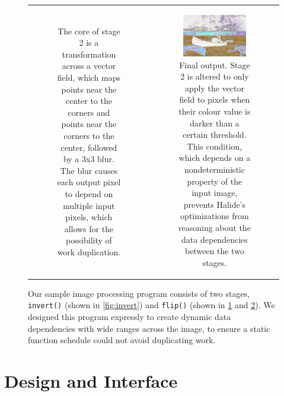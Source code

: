 \documentclass{article}
\begin{document}
\begin{figure}[t]
\begin{tabular}{cc}
\begin{subfigure}[b]{0.45\textwidth}
\begin{center}
		\end{center}
		\caption{The core of stage 2 is a transformation across a vector field, which maps points near the center to the corners and points near the corners to the center, followed by a 3x3 blur. The blur causes each output pixel to depend on multiple input pixels, which allows for the possibility of work duplication.}
		\label{fig:flip-blur-1}
	\end{subfigure} &
	\begin{subfigure}[b]{0.45\textwidth}
		\begin{center}
		\includegraphics[width=0.85\textwidth]{canoe-3.png}
		\end{center}
		\caption{Final output. Stage 2 is altered to only apply the vector field to pixels when their colour value is darker than a certain threshold. This condition, which depends on a nondeterministic property of the input image, prevents Halide's optimizations from reasoning about the data dependencies between the two stages.}
		\label{fig:flip-blur-2}
	\end{subfigure}
	\end{tabular}
	\caption{Our sample image processing program consists of two stages, \texttt{invert()} (shown in \ref{fig:invert}) and \texttt{flip()} (shown in \ref{fig:flip-blur-1} and \ref{fig:flip-blur-2}). We designed this program expressly to create dynamic data dependencies with wide ranges across the image, to ensure a static function schedule could not avoid duplicating work.}

	\label{fig:flip}
\end{figure}

\section{Design and Interface}
\end{document}
